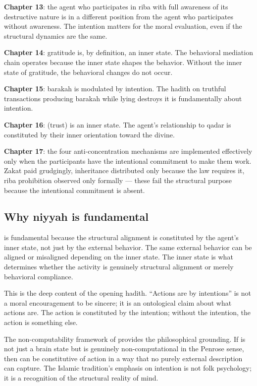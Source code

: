 \textbf{Chapter 13}: the agent who participates in riba with full
awareness of its destructive nature is in a different position
from the agent who participates without awareness. The intention
matters for the moral evaluation, even if the structural dynamics
are the same.

\textbf{Chapter 14}: gratitude is, by definition, an inner state.
The behavioral mediation chain operates because the inner state
shapes the behavior. Without the inner state of gratitude, the
behavioral changes do not occur.

\textbf{Chapter 15}: barakah is modulated by intention. The hadith
on truthful transactions producing barakah while lying destroys it
is fundamentally about intention.

\textbf{Chapter 16}:  (trust) is an inner state. The
agent's relationship to qadar is constituted by their inner
orientation toward the divine.

\textbf{Chapter 17}: the four anti-concentration mechanisms are
implemented effectively only when the participants have the
intentional commitment to make them work. Zakat paid grudgingly,
inheritance distributed only because the law requires it, riba
prohibition observed only formally --- these fail the structural
purpose because the intentional commitment is absent.

\subsection{Why niyyah is fundamental}

 is fundamental because the structural alignment is
constituted by the agent's inner state, not just by the external
behavior. The same external behavior can be aligned or misaligned
depending on the inner state. The inner state is what determines
whether the activity is genuinely structural alignment or merely
behavioral compliance.

This is the deep content of the opening hadith. ``Actions are by
intentions'' is not a moral encouragement to be sincere; it is an
ontological claim about what actions are. The action is
constituted by the intention; without the intention, the action
is something else.

The non-computability framework of 
provides the philosophical grounding. If  is not just
a brain state but is genuinely non-computational in the Penrose
sense, then  can be constitutive of action in a way
that no purely external description can capture. The Islamic
tradition's emphasis on intention is not folk psychology; it is a
recognition of the structural reality of mind.

